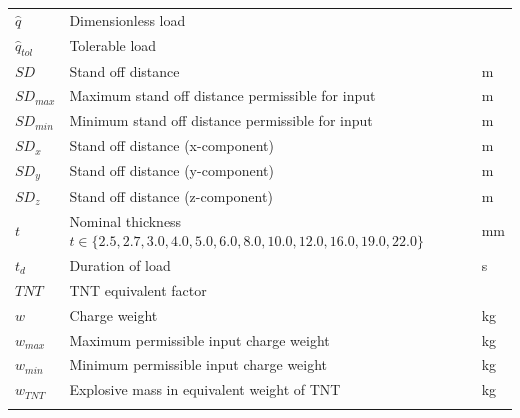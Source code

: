 \documentclass[12pt]{article}
\begin{document}
\begin{longtabu}{l X[l] l}
\\
$\hat{q}$ & Dimensionless load & 
\\
${\hat{q}_{tol}}$ & Tolerable load & 
\\
$SD$ & Stand off distance & m
\\
${SD_{max}}$ & Maximum stand off distance permissible for input & m
\\
${SD_{min}}$ & Minimum stand off distance permissible for input & m
\\
${SD_{x}}$ & Stand off distance (x-component) & m
\\
${SD_{y}}$ & Stand off distance (y-component) & m
\\
${SD_{z}}$ & Stand off distance (z-component) & m
\\
$t$ & Nominal thickness $t\in{}\{2.5,2.7,3.0,4.0,5.0,6.0,8.0,10.0,12.0,16.0,19.0,22.0\}$ & mm
\\
${t_{d}}$ & Duration of load & s
\\
$TNT$ & TNT equivalent factor & 
\\
$w$ & Charge weight & kg
\\
${w_{max}}$ & Maximum permissible input charge weight & kg
\\
${w_{min}}$ & Minimum permissible input charge weight & kg
\\
${w_{TNT}}$ & Explosive mass in equivalent weight of TNT & kg
\\
\bottomrule
\label{Table:ToS}
\end{longtabu}
\end{document}
